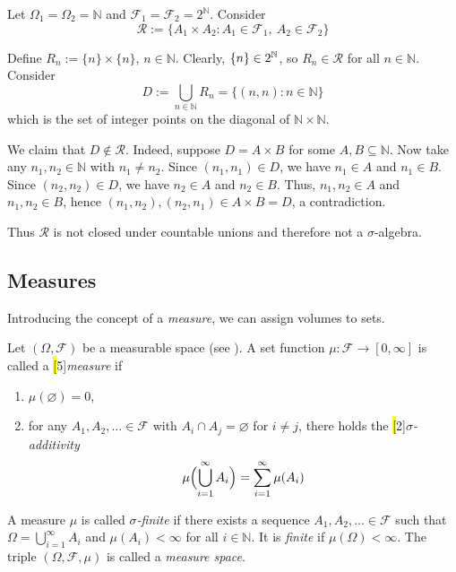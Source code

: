 \begin{example} %
Let $\Omega_1 = \Omega_2 = \mathbb{N}$ and $\mathcal{F}_1 = \mathcal{F}_2 = 2^{\mathbb{N}}$. Consider
\[
  \mathcal{R} := \{A_1 \times A_2 : A_1 \in \mathcal{F}_1,\ A_2 \in \mathcal{F}_2\}
\]

Define
\(
  R_n := \{n\} \times \{n\}
\), $n \in \mathbb{N}$.
Clearly, $\{n\} \in 2^{\mathbb{N}}$, so $R_n \in \mathcal{R}$ for all $n \in \mathbb{N}$.
Consider
\[
  D := \bigcup_{n \in \mathbb{N}} R_n = \{(n,n) : n \in \mathbb{N}\}
\]
which is the set of integer points on the diagonal of $\mathbb{N} \times \mathbb{N}$.

We claim that $D \notin \mathcal{R}$. 
Indeed, suppose $D = A \times B$ for some $A,B \subseteq \mathbb{N}$. 
Now take any $n_1, n_2 \in \mathbb{N}$ with $n_1 \neq n_2$.
Since $(n_1,n_1) \in D$, we have $n_1 \in A$ and $n_1 \in B$. 
Since $(n_2,n_2) \in D$, we have $n_2 \in A$ and $n_2 \in B$.
Thus, $n_1, n_2 \in A$ and $n_1, n_2 \in B$, hence $(n_1,n_2), (n_2,n_1) \in A \times B = D$, a contradiction.

Thus $\mathcal{R}$ is not closed under countable unions and therefore not a $\sigma$-algebra.
\end{example}

\subsection{Measures}

Introducing the concept of a \emph{measure}, we can assign volumes to sets.

\begin{definition}[Measure]\label{def:measure}
  Let $(\Omega,\mathcal{F})$ be a measurable space (see ).
  A set function $\mu : \mathcal{F} \to [0,\infty]$ is called a \hl[5]{\emph{measure}} if
  \begin{enumerate}[label=(\roman*)]
  \item $\mu(\varnothing) = 0$,\smallskip
  \item for any $A_1,A_2,\dots \in \mathcal{F}$ with $A_i \cap A_j = \varnothing$ for $i \neq j$, there holds the \hl[2]{\emph{$\sigma$-additivity}}
  \begin{equation}
    \mu\Bigl(\bigcup_{i=1}^{\infty} A_i\Bigr) = \sum_{i=1}^{\infty} \mu(A_i)
    \label{eq:sigma-additivity}
  \end{equation}
  \end{enumerate}
  A measure $\mu$ is called \emph{$\sigma$-finite} if there exists a sequence $A_1,A_2,\dots \in \mathcal{F}$ such that $\Omega = \bigcup_{i=1}^{\infty} A_i$ and $\mu(A_i) < \infty$ for all $i\in \mathbb{N}$.
  It is \emph{finite} if $\mu(\Omega) < \infty$.
  The triple $(\Omega,\mathcal{F},\mu)$ is called a \emph{measure space}.
\end{definition}

